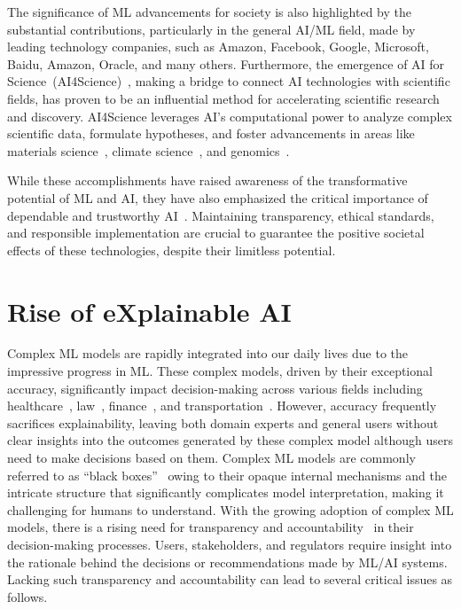 The significance of ML advancements for society is also highlighted by 
the substantial contributions, particularly in
the general AI/ML field, made by leading technology companies,
such as Amazon, Facebook, Google, Microsoft, Baidu, Amazon, Oracle,
and many others.
%
Furthermore, the emergence of AI for Science~(AI4Science)~\cite{ai4sci-corr23,aiqtcs-corr23}, 
making a bridge to connect AI technologies with scientific fields, 
has proven to be an influential method for accelerating scientific research and discovery.
%
AI4Science leverages AI's computational power to analyze complex scientific data, formulate hypotheses, 
and foster advancements in areas like materials science~\cite{bdciw-nature18}, 
climate science~\cite{khu-natureg20,dbcl-gmd23}, and genomics~\cite{aige-aihl23,wsnp-nrg22}.

While these accomplishments have raised awareness of the transformative potential of ML and AI, 
they have also emphasized the critical importance of dependable and trustworthy
AI~\cite{wing-cacm21,trustai-acmc23,kurd-csur22,sss-cacm22,ms-rw22,msi-fai23}.
%
Maintaining transparency, ethical standards, and responsible implementation are 
crucial to guarantee the positive societal effects of these technologies,
despite their limitless potential.

\section{Rise of eXplainable AI}

Complex ML models are rapidly integrated 
into our daily lives due to the impressive progress in ML.
%
These complex models, driven by their exceptional accuracy, significantly impact decision-making 
across various fields including healthcare~\cite{aimed-jbhi20,mpr-jfmpc19,rcbt-nm22,racc-jamia20,xaihealth-access22},
 law~\cite{raai-sp19,ksarv-mecon22}, finance~\cite{aifin20,gklp-jbef21,af-fintech19}, and
transportation~\cite{adlb-sust19,nmnk-sust20,hy-rits20}.
%
However, accuracy frequently sacrifices explainability, 
leaving both domain experts and general users without clear insights into the outcomes generated 
by these complex model although users need to make decisions based on them.
%
Complex ML models are commonly referred to as ``black boxes''~\cite{lg-access19,yyx-if22,ya-lim19,carab-ais20}
owing to their opaque internal mechanisms and 
the intricate structure that significantly complicates model interpretation,
making it challenging for humans to understand.
%
With the growing adoption of complex ML models, there is a rising need for
transparency and accountability~\cite{rai-jams20,vw-pt21,lh-ipr20,trai-nature20} 
in their decision-making processes.
%
Users, stakeholders, and regulators require insight into the
rationale behind the decisions or recommendations made by ML/AI systems.
%
Lacking such transparency and accountability can lead to several critical issues
as follows.


